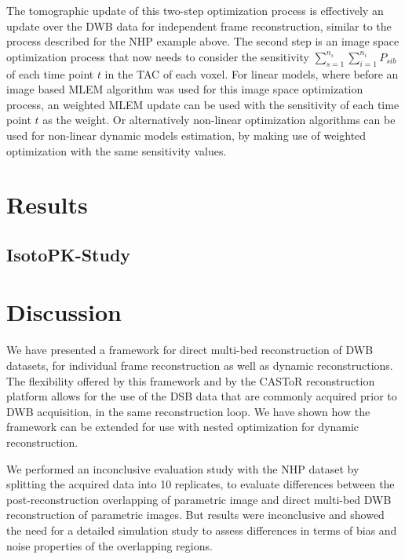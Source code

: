 The tomographic update of this two-step optimization process is effectively an update over the DWB data for independent frame reconstruction, similar to the process described for the NHP example above. The second step is an image space optimization process that now needs to consider the sensitivity $\sum_{s=1}^{n_s} \sum_{i=1}^{n_i}  P_{sib}$ of each time point $t$ in the TAC of each voxel. For linear models, where before an image based MLEM algorithm was used for this image space optimization process, an weighted MLEM update can be used with the sensitivity of each time point $t$ as the weight. Or alternatively non-linear optimization algorithms can be used for non-linear dynamic models estimation, by making use of weighted optimization with the same sensitivity values.

\section{Results}

\subsection{IsotoPK-Study}



\section{Discussion}
We have presented a framework for direct multi-bed reconstruction of DWB datasets, for individual frame reconstruction as well as dynamic reconstructions. The flexibility offered by this framework and by the CASToR reconstruction platform allows for the use of the DSB data that are commonly acquired prior to DWB acquisition, in the same reconstruction loop. We have shown how the framework can be extended for use with nested optimization for dynamic reconstruction.

We performed an inconclusive evaluation study with the NHP dataset by splitting the acquired data into 10 replicates, to evaluate differences between the post-reconstruction overlapping of parametric image and direct multi-bed DWB reconstruction of parametric images. But results were inconclusive and showed the need for a detailed simulation study to assess differences in terms of bias and noise properties of the overlapping regions. 
